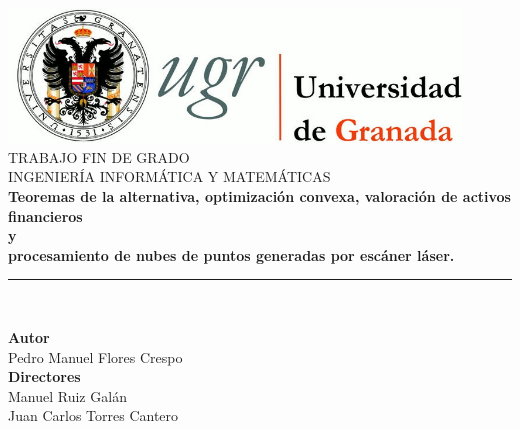 \begin{titlepage}
	
	\newlength{\centeroffset}
	\setlength{\centeroffset}{-0.5\oddsidemargin}
	\addtolength{\centeroffset}{0.5\evensidemargin}
	\thispagestyle{empty}
	
	\noindent\hspace*{\centeroffset}\begin{minipage}{\textwidth}
		
		\centering
		\includegraphics[width=0.9\textwidth]{imagenes/logo_ugr.jpg}\\[1.4cm]
		
		\textsc{ \Large TRABAJO FIN DE GRADO\\[0.2cm]}
		\textsc{ INGENIERÍA INFORMÁTICA Y MATEMÁTICAS}\\[1cm]
		{\Large\bfseries Teoremas de la alternativa, optimización convexa, valoración de activos financieros \\
		}
		{\Large\bfseries y \\
		}
		{\Large\bfseries procesamiento de nubes de puntos generadas por escáner láser.\\
		}
		\noindent\rule[-1ex]{\textwidth}{2pt}\\[3.5ex]
	\end{minipage}
	
	\vspace{1cm}
	\noindent\hspace*{\centeroffset}\begin{minipage}{\textwidth}
		\centering
		
		\textbf{Autor}\\ {Pedro Manuel Flores Crespo}\\[2.5ex]
		\textbf{Directores}\\
		{Manuel Ruiz Galán \\
			Juan Carlos Torres Cantero }\\[2cm]
		

\end{minipage}
\end{titlepage}
